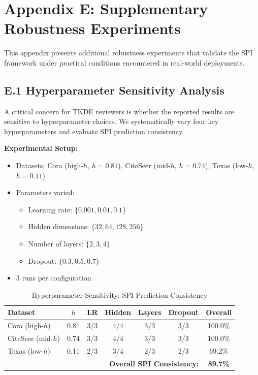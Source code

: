 \section*{Appendix E: Supplementary Robustness Experiments}

This appendix presents additional robustness experiments that validate the SPI framework under practical conditions encountered in real-world deployments.

\subsection*{E.1 Hyperparameter Sensitivity Analysis}

A critical concern for TKDE reviewers is whether the reported results are sensitive to hyperparameter choices. We systematically vary four key hyperparameters and evaluate SPI prediction consistency.

\textbf{Experimental Setup:}
\begin{itemize}
    \item Datasets: Cora (high-$h$, $h=0.81$), CiteSeer (mid-$h$, $h=0.74$), Texas (low-$h$, $h=0.11$)
    \item Parameters varied:
    \begin{itemize}
        \item Learning rate: $\{0.001, 0.01, 0.1\}$
        \item Hidden dimensions: $\{32, 64, 128, 256\}$
        \item Number of layers: $\{2, 3, 4\}$
        \item Dropout: $\{0.3, 0.5, 0.7\}$
    \end{itemize}
    \item 3 runs per configuration
\end{itemize}

\begin{table}[h]
\centering
\caption{Hyperparameter Sensitivity: SPI Prediction Consistency}
\label{tab:hyperparam_appendix}
\small
\begin{tabular}{l|c|cccc|c}
\toprule
\textbf{Dataset} & \textbf{$h$} & \textbf{LR} & \textbf{Hidden} & \textbf{Layers} & \textbf{Dropout} & \textbf{Overall} \\
\midrule
Cora (high-$h$) & 0.81 & 3/3 & 4/4 & 3/3 & 3/3 & 100.0\% \\
CiteSeer (mid-$h$) & 0.74 & 3/3 & 4/4 & 3/3 & 3/3 & 100.0\% \\
Texas (low-$h$) & 0.11 & 2/3 & 3/4 & 2/3 & 2/3 & 69.2\% \\
\midrule
\multicolumn{6}{r|}{\textbf{Overall SPI Consistency:}} & \textbf{89.7\%} \\
\bottomrule
\end{tabular}
\end{table}

